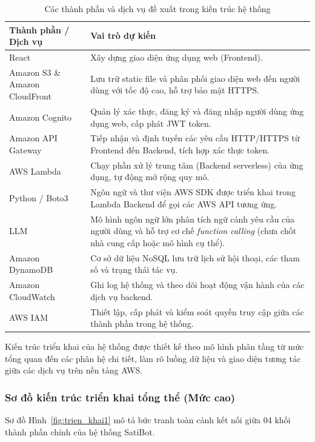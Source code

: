 \documentclass[a4paper,12pt]{article}
\newcommand{\bangfont}{\fontsize{12}{15}\selectfont}
\begin{document}
\begin{table}[htbp]
\centering
\caption{Các thành phần và dịch vụ đề xuất trong kiến trúc hệ thống}
\label{tab:kientruc}
\bangfont
\begin{tabularx}{\linewidth}{@{}p{4.8cm}Y@{}}
\toprule
\textbf{Thành phần / Dịch vụ} & \textbf{Vai trò dự kiến}\\
\midrule
React & Xây dựng giao diện ứng dụng web (Frontend).\\
Amazon S3 \& Amazon CloudFront & Lưu trữ static file và phân phối giao diện web đến người dùng với tốc độ cao, hỗ trợ bảo mật HTTPS.\\
Amazon Cognito & Quản lý xác thực, đăng ký và đăng nhập người dùng ứng dụng web, cấp phát JWT token.\\
Amazon API Gateway & Tiếp nhận và định tuyến các yêu cầu HTTP/HTTPS từ Frontend đến Backend, tích hợp xác thực token.\\
AWS Lambda & Chạy phần xử lý trung tâm (Backend serverless) của ứng dụng, tự động mở rộng quy mô.\\
Python / Boto3 & Ngôn ngữ và thư viện AWS SDK được triển khai trong Lambda Backend để gọi các AWS API tương ứng.\\
LLM & Mô hình ngôn ngữ lớn phân tích ngữ cảnh yêu cầu của người dùng và hỗ trợ cơ chế \textit{function calling} (chưa chốt nhà cung cấp hoặc mô hình cụ thể).\\
Amazon DynamoDB & Cơ sở dữ liệu NoSQL lưu trữ lịch sử hội thoại, các tham số và trạng thái tác vụ.\\
Amazon CloudWatch & Ghi log hệ thống và theo dõi hoạt động vận hành của các dịch vụ backend.\\
AWS IAM & Thiết lập, cấp phát và kiểm soát quyền truy cập giữa các thành phần trong hệ thống.\\
\bottomrule
\end{tabularx}
\end{table}

Kiến trúc triển khai của hệ thống được thiết kế theo mô hình phân tầng từ mức tổng quan đến các phân hệ chi tiết, làm rõ luồng dữ liệu và giao diện tương tác giữa các dịch vụ trên nền tảng AWS.

\subsubsection{Sơ đồ kiến trúc triển khai tổng thể (Mức cao)}

Sơ đồ Hình~\ref{fig:trien_khai1} mô tả bức tranh toàn cảnh kết nối giữa 04 khối thành phần chính của hệ thống SatiBot.
\end{document}
